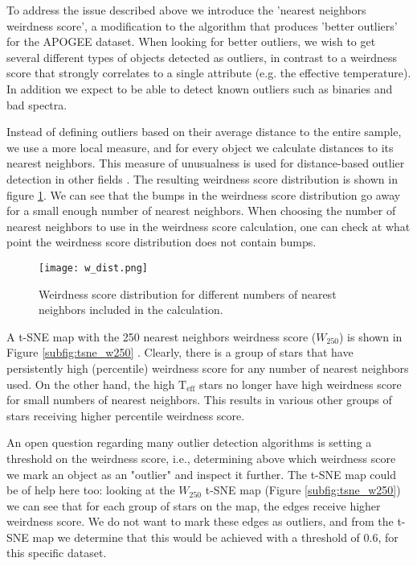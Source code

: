 \documentclass[fleqn,usenatbib]{mnras}
\begin{document}
To address the issue described above we introduce the 'nearest neighbors weirdness score', a modification to the algorithm that produces 'better outliers' for the APOGEE dataset. When looking for better outliers, we wish to get several different types of objects detected as outliers, in contrast to a weirdness score that strongly correlates to a single attribute (e.g. the effective temperature). In addition we expect to be able to detect known outliers such as binaries and bad spectra. 

Instead of defining outliers based on their average distance to the entire sample, we use a more local measure, and for every object we calculate distances to its nearest neighbors. This measure of unusualness is used for distance-based outlier detection in other fields \citep{knorr99,knorr00}. The resulting weirdness score distribution is shown in figure \ref{fig:wsnn}. We can see that the bumps in the weirdness score distribution go away for a small enough number of nearest neighbors. When choosing the number of nearest neighbors to use in the weirdness score calculation, one can check at what point the weirdness score distribution does not contain bumps.

\begin{figure}
\begin{center}
  \texttt{[image: w\_dist.png]}
  \caption{Weirdness score distribution for different numbers of nearest neighbors included in the calculation.}
  \label{fig:wsnn}
  \end{center}
\end{figure}

A t-SNE map with the 250 nearest neighbors weirdness score ($W_{250}$) is shown in Figure \ref{subfig:tsne_w250} . Clearly, there is a group of stars that have persistently high (percentile) weirdness score for any number of nearest neighbors used. On the other hand, the high $\mathrm{T}_{\mathrm{eff}}$ stars no longer have high weirdness score for small numbers of nearest neighbors. This results in various other groups of stars receiving higher percentile weirdness score. 


An open question regarding many outlier detection algorithms is setting a threshold on the weirdness score, i.e., determining above which weirdness score we mark an object as an "outlier" and inspect it further. The t-SNE map could be of help here too: looking at the $W_{250}$ t-SNE map (Figure \ref{subfig:tsne_w250}) we can see that for each group of stars on the map, the edges receive higher weirdness score. We do not want to mark these edges as outliers, and from the t-SNE map we determine that this would be achieved with a threshold of 0.6, for this specific dataset.
\end{document}
